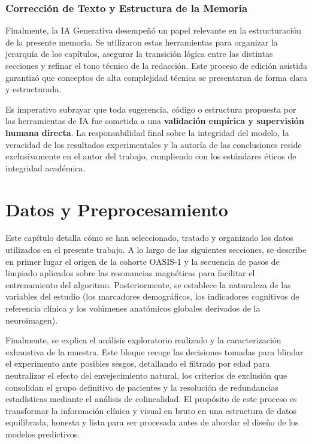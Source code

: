 \documentclass[12pt, oneside, english, spanish]{book}
\begin{document}
\subsection{Corrección de Texto y Estructura de la Memoria} \label{subsec:ia_narrativa}

Finalmente, la IA Generativa desempeñó un papel relevante en la estructuración de la presente memoria. Se utilizaron estas herramientas para organizar la jerarquía de los capítulos, asegurar la transición lógica entre las distintas secciones y refinar el tono técnico de la redacción. Este proceso de edición asistida garantizó que conceptos de alta complejidad técnica se presentaran de forma clara y estructurada.

Es imperativo subrayar que toda sugerencia, código o estructura propuesta por las herramientas de IA fue sometida a una \textbf{validación empírica y supervisión humana directa}. La responsabilidad final sobre la integridad del modelo, la veracidad de los resultados experimentales y la autoría de las conclusiones reside exclusivamente en el autor del trabajo, cumpliendo con los estándares éticos de integridad académica.


\chapter{Datos y Preprocesamiento} \label{chap:datos_preprocesamiento}

Este capítulo detalla cómo se han seleccionado, tratado y organizado los datos utilizados en el presente trabajo. A lo largo de las siguientes secciones, se describe en primer lugar el origen de la cohorte OASIS-1 y la secuencia de pasos de limpiado aplicados sobre las resonancias magnéticas para facilitar el entrenamiento del algoritmo. Posteriormente, se establece la naturaleza de las variables del estudio (los marcadores demográficos, los indicadores cognitivos de referencia clínica y los volúmenes anatómicos globales derivados de la neuroimagen).

Finalmente, se explica el análisis exploratorio realizado y la caracterización exhaustiva de la muestra. Este bloque recoge las decisiones tomadas para blindar el experimento ante posibles sesgos, detallando el filtrado por edad para neutralizar el efecto del envejecimiento natural, los criterios de exclusión que consolidan el grupo definitivo de pacientes y la resolución de redundancias estadísticas mediante el análisis de colinealidad. El propósito de este proceso es transformar la información clínica y visual en bruto en una estructura de datos equilibrada, honesta y lista para ser procesada antes de abordar el diseño de los modelos predictivos.
\end{document}
